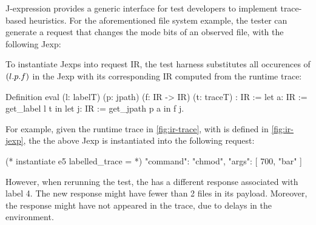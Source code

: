 J-expression provides a generic interface for test developers to implement
trace-based heuristics.  For the aforementioned file system example, the tester
can generate a request that changes the mode bits of an observed file, with the
following Jexp:

To instantiate Jexps into request IR, the test harness substitutes all
occurences of $(l.p.f)$ in the Jexp with its corresponding IR computed
from the runtime trace:
\begin{coq}
  Definition eval (l: labelT) (p: jpath) (f: IR -> IR) (t: traceT) : IR :=
    let a: IR := get_label l t in
    let j: IR := get_jpath p a in
    f j.
\end{coq}

For example, given the runtime trace in \autoref{fig:ir-trace}, with  is
defined in \autoref{fig:ir-jexp}, the the above Jexp is instantiated into the
following request:

\begin{json}
  (* instantiate e5 labelled_trace = *)
  { 
    "command": "chmod",
    "args": [ 700, "bar" ]
  }
\end{json}

However, when rerunning the test, the  has a different response
associated with label 4.  The new response  might have fewer than 2
files in its payload.  Moreover, the response  might have not appeared
in the trace, due to delays in the environment.

